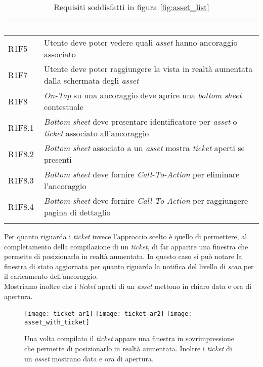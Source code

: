 {
    \setlength{\freewidth}{\dimexpr\textwidth-10\tabcolsep}
    \renewcommand{\arraystretch}{1.5}
    \centering
    \setlength{\aboverulesep}{0pt}
    \setlength{\belowrulesep}{0pt}
    \begin{longtable}{C{.15\freewidth} C{1\freewidth}}
       \toprule
    \textcolor{white}{\textbf{Codice}}&
    \textcolor{white}{\textbf{Descrizione}}\\
    \toprule
    \endhead

    R1F5 & Utente deve poter vedere quali \textit{asset} hanno ancoraggio associato\\
    R1F7 & Utente deve poter raggiungere la vista in realtà aumentata dalla schermata degli \textit{asset}\\
    R1F8 & \textit{On-Tap} su una ancoraggio deve aprire una \textit{bottom sheet} contestuale\\
    R1F8.1 & \textit{Bottom sheet} deve presentare identificatore per \textit{asset} o \textit{ticket} associato all'ancoraggio\\
    R1F8.2 & \textit{Bottom sheet} associato a un \textit{asset} mostra \textit{ticket} aperti se presenti\\
    R1F8.3 & \textit{Bottom sheet} deve fornire \textit{Call-To-Action} per eliminare l'ancoraggio\\
    R1F8.4 & \textit{Bottom sheet} deve fornire \textit{Call-To-Action} per raggiungere pagina di dettaglio\\
    

    \bottomrule
    \caption{Requisiti soddisfatti in figura \ref{fig:asset_list}}
    \end{longtable}
}

Per quanto riguarda i \textit{ticket} invece l'approccio scelto è quello di permettere, al completamento della compilazione di un \textit{ticket}, di far apparire una finestra che permette di posizionarlo in realtà aumentata. In questo caso si può notare la finestra di stato aggiornata per quanto riguarda la notifica del livello di \textit{scan} per il caricamento dell'ancoraggio.\\
Mostriamo inoltre che i \textit{ticket} aperti di un \textit{asset} mettono in chiaro data e ora di apertura.

\begin{figure}[H]
  \centering
  \texttt{[image: ticket\_ar1]}\hfill
  \texttt{[image: ticket\_ar2]}\hfill
  \texttt{[image: asset\_with\_ticket]}
  \caption[Caricamento \textit{ticket} realtà aumentata e \textit{ticket} su \textit{asset}]{Una volta compilato il \textit{ticket} appare una finestra in sovrimpressione che permette di posizionarlo in realtà aumentata. Inoltre i \textit{ticket} di un \textit{asset} mostrano data e ora di apertura.}
  \label{fig:ticket_ar}
\end{figure}

